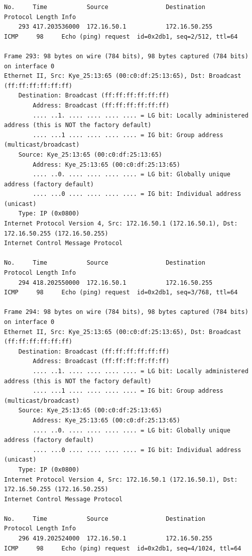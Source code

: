 \documentclass[a4paper,11pt]{article}
\begin{document}
\begin{lstlisting}
No.     Time           Source                Destination           Protocol Length Info
    293 417.203536000  172.16.50.1           172.16.50.255         ICMP     98     Echo (ping) request  id=0x2db1, seq=2/512, ttl=64

Frame 293: 98 bytes on wire (784 bits), 98 bytes captured (784 bits) on interface 0
Ethernet II, Src: Kye_25:13:65 (00:c0:df:25:13:65), Dst: Broadcast (ff:ff:ff:ff:ff:ff)
    Destination: Broadcast (ff:ff:ff:ff:ff:ff)
        Address: Broadcast (ff:ff:ff:ff:ff:ff)
        .... ..1. .... .... .... .... = LG bit: Locally administered address (this is NOT the factory default)
        .... ...1 .... .... .... .... = IG bit: Group address (multicast/broadcast)
    Source: Kye_25:13:65 (00:c0:df:25:13:65)
        Address: Kye_25:13:65 (00:c0:df:25:13:65)
        .... ..0. .... .... .... .... = LG bit: Globally unique address (factory default)
        .... ...0 .... .... .... .... = IG bit: Individual address (unicast)
    Type: IP (0x0800)
Internet Protocol Version 4, Src: 172.16.50.1 (172.16.50.1), Dst: 172.16.50.255 (172.16.50.255)
Internet Control Message Protocol

No.     Time           Source                Destination           Protocol Length Info
    294 418.202550000  172.16.50.1           172.16.50.255         ICMP     98     Echo (ping) request  id=0x2db1, seq=3/768, ttl=64

Frame 294: 98 bytes on wire (784 bits), 98 bytes captured (784 bits) on interface 0
Ethernet II, Src: Kye_25:13:65 (00:c0:df:25:13:65), Dst: Broadcast (ff:ff:ff:ff:ff:ff)
    Destination: Broadcast (ff:ff:ff:ff:ff:ff)
        Address: Broadcast (ff:ff:ff:ff:ff:ff)
        .... ..1. .... .... .... .... = LG bit: Locally administered address (this is NOT the factory default)
        .... ...1 .... .... .... .... = IG bit: Group address (multicast/broadcast)
    Source: Kye_25:13:65 (00:c0:df:25:13:65)
        Address: Kye_25:13:65 (00:c0:df:25:13:65)
        .... ..0. .... .... .... .... = LG bit: Globally unique address (factory default)
        .... ...0 .... .... .... .... = IG bit: Individual address (unicast)
    Type: IP (0x0800)
Internet Protocol Version 4, Src: 172.16.50.1 (172.16.50.1), Dst: 172.16.50.255 (172.16.50.255)
Internet Control Message Protocol

No.     Time           Source                Destination           Protocol Length Info
    296 419.202524000  172.16.50.1           172.16.50.255         ICMP     98     Echo (ping) request  id=0x2db1, seq=4/1024, ttl=64


\end{lstlisting}
\end{document}
